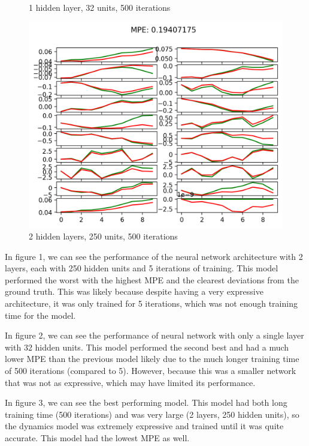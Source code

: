\documentclass[letterpaper, 10pt]{article}
\begin{document}
\begin{figure}[h]
\begin{minipage}{0.32\textwidth}
        \caption{1 hidden layer, 32 units, 500 iterations}
    \end{minipage} \hfill
    \begin{minipage}{0.32\textwidth}
        \centering
        \includegraphics[width=\textwidth]{itr_0_predictions_n500_arch2x250}
        \caption{2 hidden layers, 250 units, 500 iterations}
    \end{minipage}
\end{figure}

In figure 1, we can see the performance of the neural network architecture with 2 layers, each with
250 hidden units and 5 iterations of training. This model performed the worst with the highest MPE and 
the clearest deviations from the ground truth. This was likely because despite having a very expressive
architecture, it was only trained for 5 iterations, which was not enough training time for the model.

In figure 2, we can see the performance of neural network with only a single layer with 32 hidden units. This
model performed the second best and had a much lower MPE than the previous model likely due to the much longer
training time of 500 iterations (compared to 5). However, because this was a smaller network that was not as
expressive, which may have limited its performance. 

In figure 3, we can see the best performing model. This model had both long training time (500 iterations) 
and was very large (2 layers, 250 hidden units), so the dynamics model was extremely expressive and trained 
until it was quite accurate. This model had the lowest MPE as well. 
\end{document}
